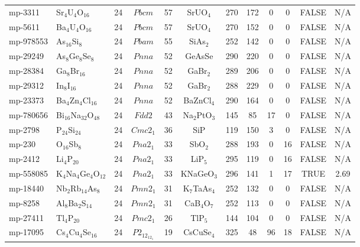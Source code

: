 {\begin{longtable}{llcccccccccc}
    mp-3311 & Sr$_{4}$U$_{4}$O$_{16}$ & 24    & $Pbcm$ & 57    & SrUO$_{4}$ & 270   & 172   & 0     & 0     & FALSE & N/A \\
    mp-5611 & Ba$_{4}$U$_{4}$O$_{16}$ & 24    & $Pbcm$ & 57    & SrUO$_{4}$ & 270   & 152   & 0     & 0     & FALSE & N/A \\
    mp-978553 & As$_{16}$Si$_{8}$ & 24    & $Pbam$ & 55    & SiAs$_{2}$ & 252   & 142   & 0     & 0     & FALSE & N/A \\
    mp-29249 & As$_{8}$Ge$_{8}$Se$_{8}$ & 24    & $Pnna$ & 52    & GeAsSe & 290   & 220   & 0     & 0     & FALSE & N/A \\
    mp-28384 & Ga$_{8}$Br$_{16}$ & 24    & $Pnna$ & 52    & GaBr$_{2}$ & 289   & 206   & 0     & 0     & FALSE & N/A \\
    mp-29312 & In$_{8}$I$_{16}$ & 24    & $Pnna$ & 52    & GaBr$_{2}$ & 288   & 229   & 0     & 0     & FALSE & N/A \\
    mp-23373 & Ba$_{4}$Zn$_{4}$Cl$_{16}$ & 24    & $Pnna$ & 52    & BaZnCl$_{4}$ & 290   & 164   & 0     & 0     & FALSE & N/A \\
    mp-780656 & Bi$_{16}$Na$_{32}$O$_{48}$ & 24    & $Fdd2$ & 43    & Na$_{2}$PtO$_{3}$ & 145   & 85    & 17    & 0     & FALSE & N/A \\
    mp-2798 & P$_{24}$Si$_{24}$ & 24    & $Cmc2_1$ & 36    & SiP   & 119   & 150   & 3     & 0     & FALSE & N/A \\
    mp-230 & O$_{16}$Sb$_{8}$ & 24    & $Pna2_1$ & 33    & SbO$_{2}$ & 288   & 193   & 0     & 16    & FALSE & N/A \\
    mp-2412 & Li$_{4}$P$_{20}$ & 24    & $Pna2_1$ & 33    & LiP$_{5}$ & 295   & 119   & 0     & 16    & FALSE & N/A \\
    mp-558085 & K$_{4}$Na$_{4}$Ge$_{4}$O$_{12}$ & 24    & $Pna2_1$ & 33    & KNaGeO$_{3}$ & 296   & 141   & 1     & 17    & TRUE  & 2.69  \\
    mp-18440 & Nb$_{2}$Rb$_{14}$As$_{8}$ & 24    & $Pmn2_1$ & 31    & K$_{7}$TaAs$_{4}$ & 252   & 132   & 0     & 0     & FALSE & N/A \\
    mp-8258 & Al$_{8}$Ba$_{2}$S$_{14}$ & 24    & $Pmn2_1$ & 31    & CaB$_{4}$O$_{7}$ & 252   & 113   & 0     & 0     & FALSE & N/A \\
    mp-27411 & Tl$_{4}$P$_{20}$ & 24    & $Pmc2_1$ & 26    & TlP$_{5}$ & 144   & 104   & 0     & 0     & FALSE & N/A \\
    mp-17095 & Cs$_{4}$Cu$_{4}$Se$_{16}$ & 24    & $P2_12_12_1$ & 19    & CsCuSe$_{4}$ & 325   & 48    & 96    & 18    & FALSE & N/A \\

\end{longtable}}
